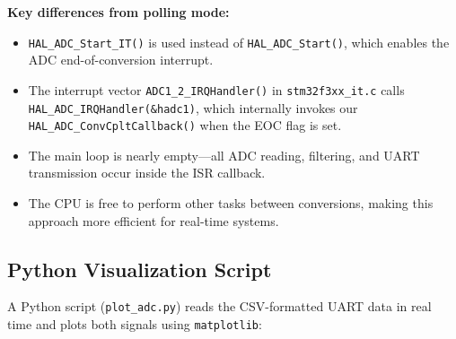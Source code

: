 \documentclass[12pt,a4paper]{article}
\begin{document}
\textbf{Key differences from polling mode:}
\begin{itemize}
    \item \texttt{HAL\_ADC\_Start\_IT()} is used instead of \texttt{HAL\_ADC\_Start()}, which enables the ADC end-of-conversion interrupt.
    \item The interrupt vector \texttt{ADC1\_2\_IRQHandler()} in \texttt{stm32f3xx\_it.c} calls \texttt{HAL\_ADC\_IRQHandler(\&hadc1)}, which internally invokes our \texttt{HAL\_ADC\_ConvCpltCallback()} when the EOC flag is set.
    \item The main loop is nearly empty---all ADC reading, filtering, and UART transmission occur inside the ISR callback.
    \item The CPU is free to perform other tasks between conversions, making this approach more efficient for real-time systems.
\end{itemize}

\subsection{Python Visualization Script}

A Python script (\texttt{plot\_adc.py}) reads the CSV-formatted UART data in real time and plots both signals using \texttt{matplotlib}:
\end{document}
